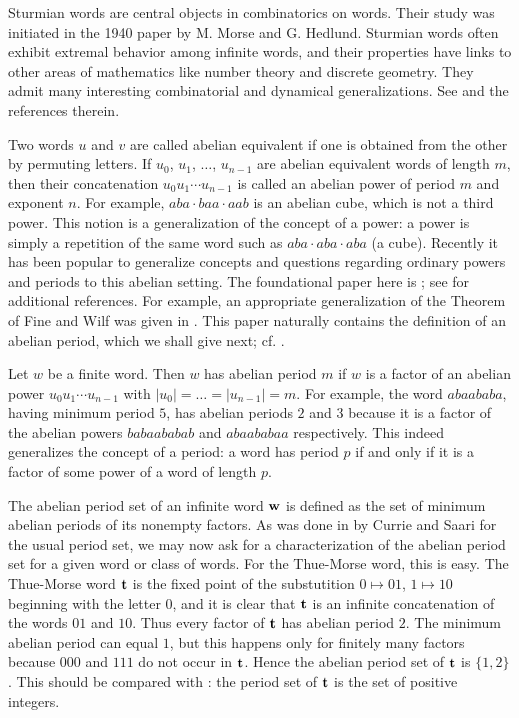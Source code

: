 \documentclass[a4paper,fleqn]{article}
\providecommand{\abs}[1]{\lvert#1\rvert}
\newcommand{\infw}[1]{%
  \ifcat\noexpand#1\relax\bm{#1}%
  \else\mathbf{#1}\fi}          %
\begin{document}
  Sturmian words are central objects in combinatorics on words. Their study was initiated in the 1940 paper
  \cite{1940:symbolic_dynamics_ii} by M. Morse and G. Hedlund. Sturmian words often exhibit extremal behavior among
  infinite words, and their properties have links to other areas of mathematics like number theory and discrete
  geometry. They admit many interesting combinatorial and dynamical generalizations. See
  \cite{1996:recent_results_on_sturmian_words,2009:episturmian_words_a_survey} and the references therein.

  Two words $u$ and $v$ are called abelian equivalent if one is obtained from the other by permuting letters. If $u_0$,
  $u_1$, $\ldots$, $u_{n-1}$ are abelian equivalent words of length $m$, then their concatenation $u_0 u_1 \cdots
  u_{n-1}$ is called an abelian power of period $m$ and exponent $n$. For example, $aba \cdot baa \cdot aab$ is an
  abelian cube, which is not a third power. This notion is a generalization of the concept of a power: a power is
  simply a repetition of the same word such as $aba \cdot aba \cdot aba$ (a cube). Recently it has been popular to
  generalize concepts and questions regarding ordinary powers and periods to this abelian setting. The foundational
  paper here is \cite{2011:abelian_complexity_of_minimal_subshifts}; see
  \cite{2016:abelian_powers_and_repetitions_in_sturmian_words} for additional references. For example, an appropriate
  generalization of the Theorem of Fine and Wilf was given in \cite{2006:fine_and_wilfs_theorem_for_abelian_periods}.
  This paper naturally contains the definition of an abelian period, which we shall give next; cf.
  \cite{2012:on_abelian_repetition_threshold}.
  
  Let $w$ be a finite word. Then $w$ has abelian period $m$ if $w$ is a factor of an abelian power $u_0 u_1 \cdots
  u_{n-1}$ with $\abs{u_0} = \ldots = \abs{u_{n-1}} = m$. For example, the word $abaababa$, having minimum period $5$,
  has abelian periods $2$ and $3$ because it is a factor of the abelian powers $babaababab$ and $abaababaa$
  respectively. This indeed generalizes the concept of a period: a word has period $p$ if and only if it is a factor of
  some power of a word of length $p$.
  
  The abelian period set of an infinite word $\infw{w}$ is defined as the set of minimum abelian periods of its
  nonempty factors. As was done in \cite{2009:least_periods_of_factors_of_infinite_words} by Currie and Saari for the
  usual period set, we may now ask for a characterization of the abelian period set for a given word or class of words.
  For the Thue-Morse word, this is easy. The Thue-Morse word $\infw{t}$ is the fixed point of the substutition
  $0 \mapsto 01$, $1 \mapsto 10$ beginning with the letter $0$, and it is clear that $\infw{t}$ is an infinite
  concatenation of the words $01$ and $10$. Thus every factor of $\infw{t}$ has abelian period $2$. The minimum abelian
  period can equal $1$, but this happens only for finitely many factors because $000$ and $111$ do not occur in
  $\infw{t}$. Hence the abelian period set of $\infw{t}$ is $\{1, 2\}$. This should be compared with
  \cite[Thm.~2]{2009:least_periods_of_factors_of_infinite_words}: the period set of $\infw{t}$ is the set of positive
  integers.
\end{document}
